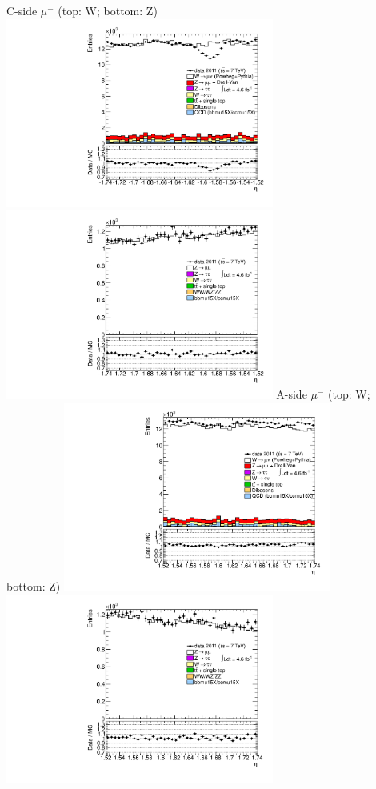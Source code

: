  {
\colb[T]
C-side $\mu^{-}$ (top: W; bottom: Z)
\centering
\includegraphics[width=0.66\textwidth]{dates/20130306/figures/etaphi/W_8_C_stack_l_eta_POS} \\
\includegraphics[width=0.66\textwidth]{dates/20130306/figures/etaphi/Z_8_C_stack_lP_eta_ALL.pdf}
A-side $\mu^{-}$ (top: W; bottom: Z)
\centering
\includegraphics[width=0.66\textwidth]{dates/20130306/figures/etaphi/W_8_A_stack_l_eta_POS} \\
\includegraphics[width=0.66\textwidth]{dates/20130306/figures/etaphi/Z_8_A_stack_lP_eta_ALL.pdf} 
\cole
}
